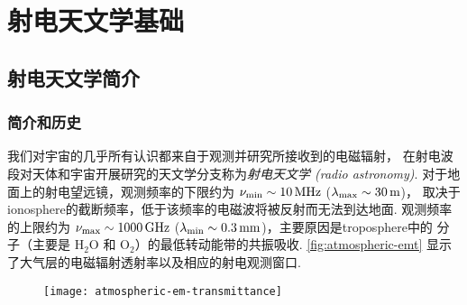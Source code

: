 

\chapter{射电天文学基础}
\label{chap:radio-astronomy}

\section{射电天文学简介}
\label{sec:radio-astro-intro}

\subsection{简介和历史}

我们对宇宙的几乎所有认识都来自于观测并研究所接收到的电磁辐射，
在射电波段对天体和宇宙开展研究的天文学分支称为\emph{射电天文学 (radio astronomy)}.
对于地面上的射电望远镜，观测频率的下限约为 $\nu_{\R{min}} \sim \SI{10}{\MHz}$
($\lambda_{\mathrm{max}} \sim \SI{30}{\meter}$)，
取决于\ac{ionosphere}的截断频率，低于该频率的电磁波将被反射而无法到达地面.
观测频率的上限约为 $\nu_{\R{max}} \sim \SI{1000}{\GHz}$
($\lambda_{\R{min}} \sim \SI{0.3}{\mm}$)，主要原因是\ac{troposphere}中的
分子（主要是 $\mathrm{H_2 O}$ 和 $\mathrm{O_2}$）的最低转动能带的共振吸收.
\autoref{fig:atmospheric-emt} 显示了大气层的电磁辐射透射率以及相应的射电观测窗口.

\begin{figure}[htp]
  \centering
  \texttt{[image: atmospheric-em-transmittance]}
  \label{fig:atmospheric-emt}
\end{figure}

